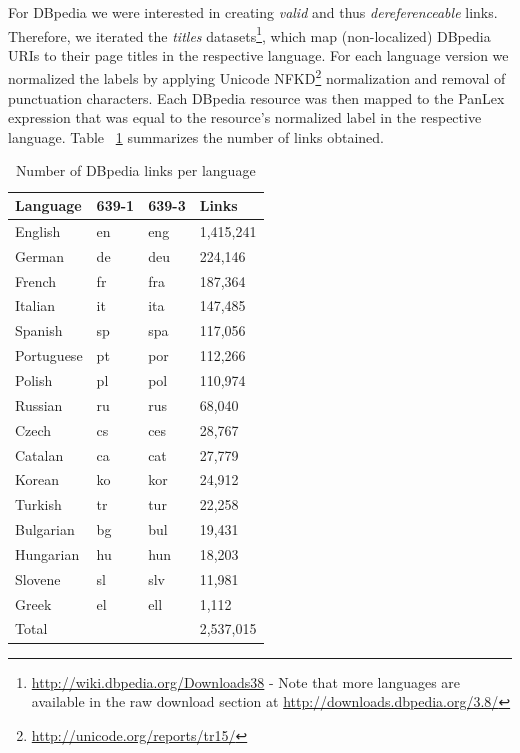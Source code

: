 \documentclass[sw]{iosart2c}
\begin{document}
For DBpedia we were interested in creating \emph{valid} and
thus \emph{dereferenceable} links.
Therefore, we iterated the \emph{titles} datasets\footnote{\url{http://wiki.dbpedia.org/Downloads38} - Note that more languages are available in the raw download section at \url{http://downloads.dbpedia.org/3.8/}},
which map (non-localized) DBpedia URIs to their page titles in the respective language.
For each language version we normalized the labels by applying
Unicode NFKD\footnote{\url{http://unicode.org/reports/tr15/}} normalization and
removal of punctuation characters.
Each DBpedia resource was then mapped to the PanLex expression that was equal to the resource's normalized label in the respective language.
Table ~\ref{fig:plx-dbp-link-counts} summarizes the number of links obtained.
\begin{table}
\centering
\begin{scriptsize}
\begin{tabular}{llll}
\toprule
Language & 639-1 & 639-3 & Links \\
\midrule
English    & en & eng & 1,415,241 \\
German     & de & deu &   224,146 \\
French     & fr & fra &   187,364 \\
Italian    & it & ita &   147,485 \\
Spanish    & sp & spa &   117,056 \\
Portuguese & pt & por &   112,266 \\
Polish     & pl & pol &   110,974 \\
Russian    & ru & rus &    68,040 \\
Czech      & cs & ces &    28,767 \\
Catalan    & ca & cat &    27,779 \\
Korean     & ko & kor &    24,912 \\
Turkish    & tr & tur &    22,258 \\
Bulgarian  & bg & bul &    19,431 \\
Hungarian  & hu & hun &    18,203 \\
Slovene    & sl & slv &    11,981 \\
Greek      & el & ell &     1,112 \\
\midrule
Total      &    &     & 2,537,015 \\
\bottomrule
\end{tabular}
\end{scriptsize}
\caption{Number of DBpedia links per language}
\label{fig:plx-dbp-link-counts}
\end{table}
\end{document}
